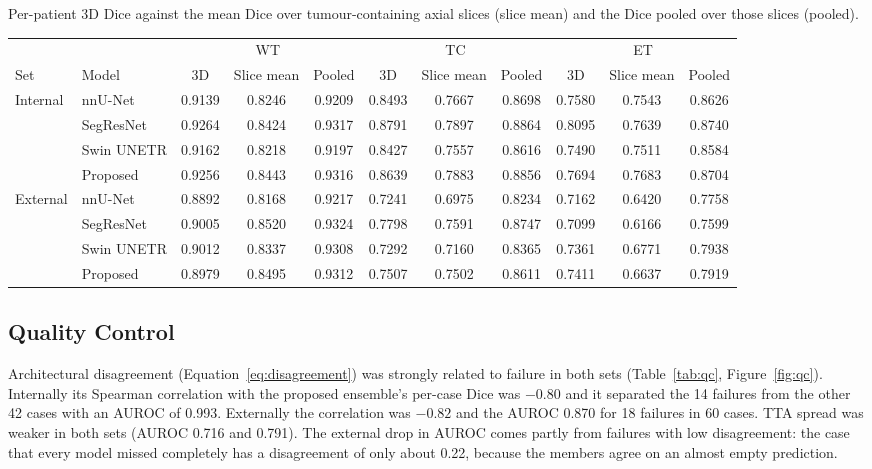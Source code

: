 \documentclass[a4paper,fleqn]{cas-sc}
\begin{document}
\begin{heretable}
\centering
\caption{Per-patient 3D Dice against the mean Dice over tumour-containing axial slices (slice mean) and the Dice pooled over those slices (pooled).}
\label{tab:protocol}
\scriptsize
\setlength{\tabcolsep}{2.5pt}
\begin{tabular*}{\textwidth}{@{\extracolsep{\fill}}llccccccccc@{}}
\toprule
 & & \multicolumn{3}{c}{WT} & \multicolumn{3}{c}{TC} & \multicolumn{3}{c}{ET} \\
\cmidrule(lr){3-5}\cmidrule(lr){6-8}\cmidrule(l){9-11}
Set & Model & 3D & Slice mean & Pooled & 3D & Slice mean & Pooled & 3D & Slice mean & Pooled \\
\midrule
\multirow{4}{*}{Internal} & nnU-Net & 0.9139 & 0.8246 & 0.9209 & 0.8493 & 0.7667 & 0.8698 & 0.7580 & 0.7543 & 0.8626 \\
 & SegResNet & 0.9264 & 0.8424 & 0.9317 & 0.8791 & 0.7897 & 0.8864 & 0.8095 & 0.7639 & 0.8740 \\
 & Swin UNETR & 0.9162 & 0.8218 & 0.9197 & 0.8427 & 0.7557 & 0.8616 & 0.7490 & 0.7511 & 0.8584 \\
 & Proposed & 0.9256 & 0.8443 & 0.9316 & 0.8639 & 0.7883 & 0.8856 & 0.7694 & 0.7683 & 0.8704 \\
\midrule
\multirow{4}{*}{External} & nnU-Net & 0.8892 & 0.8168 & 0.9217 & 0.7241 & 0.6975 & 0.8234 & 0.7162 & 0.6420 & 0.7758 \\
 & SegResNet & 0.9005 & 0.8520 & 0.9324 & 0.7798 & 0.7591 & 0.8747 & 0.7099 & 0.6166 & 0.7599 \\
 & Swin UNETR & 0.9012 & 0.8337 & 0.9308 & 0.7292 & 0.7160 & 0.8365 & 0.7361 & 0.6771 & 0.7938 \\
 & Proposed & 0.8979 & 0.8495 & 0.9312 & 0.7507 & 0.7502 & 0.8611 & 0.7411 & 0.6637 & 0.7919 \\
\bottomrule
\end{tabular*}
\end{heretable}

\subsection{Quality Control}
\label{sec:qc}

Architectural disagreement (Equation~\ref{eq:disagreement}) was strongly related to failure in both sets (Table~\ref{tab:qc}, Figure~\ref{fig:qc}). Internally its Spearman correlation with the proposed ensemble's per-case Dice was $-0.80$ and it separated the 14 failures from the other 42 cases with an AUROC of 0.993. Externally the correlation was $-0.82$ and the AUROC 0.870 for 18 failures in 60 cases. TTA spread was weaker in both sets (AUROC 0.716 and 0.791). The external drop in AUROC comes partly from failures with low disagreement: the case that every model missed completely has a disagreement of only about 0.22, because the members agree on an almost empty prediction.
\end{document}
